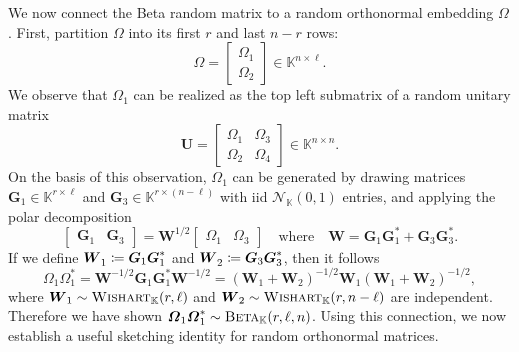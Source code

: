\documentclass[11pt]{article}
\newcommand{\field}{\mathbb{K}}
\newcommand{\mat}[1]{\boldsymbol{#1}}
\newcommand{\twobytwo}[4]{%
  \begin{bmatrix}#1 & #2 \\ #3 & #4\end{bmatrix}}
\newcommand{\onebytwo}[2]{%
  \begin{bmatrix}#1 & #2\end{bmatrix}}
\newcommand{\Wishart}{\textnormal{\textsc{Wishart}}}
\newcommand{\Beta}{\textnormal{\textsc{Beta}}}
\theoremstyle{definition}
\numberwithin{equation}{section}
\begin{document}
We now connect the Beta random matrix to a random orthonormal embedding $\mat{\varOmega}$.
First, partition $\mat{\varOmega}$ into its first $r$ and last $n - r$ rows:
\begin{equation*}
\mat{\varOmega} = \begin{bmatrix} \mat{\varOmega}_1 \\ \mat{\varOmega}_2 \end{bmatrix} \in \field^{n \times \ell}.
\end{equation*}
We observe that $\mat{\varOmega}_1$ can be realized as the top left submatrix of a random unitary matrix
%
\begin{equation*}
    \mat{U} = \twobytwo{\mat{\varOmega}_1}{\mat{\varOmega}_3}{\mat{\varOmega}_2}{\mat{\varOmega}_4} \in \field^{n\times n}.
\end{equation*}
%
On the basis of this observation, $\mat{\varOmega}_1$ can be generated by drawing matrices $\mat{G}_1 \in \field^{r \times \ell}$ and $\mat{G}_3 \in \field^{r \times (n - \ell)}$ with iid $\mathcal{N}_\field(0,1)$ entries, and applying the polar decomposition
%
\begin{equation*}
    \onebytwo{\mat{G}_1}{\mat{G}_3} = \mat{W}^{1/2} \onebytwo{\mat{\varOmega}_1}{\mat{\varOmega}_3} \quad \text{where} \quad \mat{W} = \mat{G}_1 \mat{G}_1^* + \mat{G}_3 \mat{G}_3^*.
\end{equation*}
If we define $\mat{W}_1^{\vphantom{*}} \coloneqq \mat{G}_1 \mat{G}_1^*$ and $\mat{W}_2^{\vphantom{*}} \coloneqq \mat{G}_3 \mat{G}_3^*$, then it follows
%
\begin{equation*}
    \mat{\varOmega}_1 \mat{\varOmega}_1^* 
    = \mat{W}^{-1/2}\mat{G}_1 \mat{G}_1^* \mat{W}^{-1/2} = (\mat{W}_1+\mat{W}_2)^{-1/2}\mat{W}_1(\mat{W}_1+\mat{W}_2)^{-1/2},
\end{equation*}
where $\mat{W}_1 \sim \Wishart_\field(r,\ell)$ and $\mat{W}_2\sim \Wishart_\field(r,n-\ell)$ are independent.
Therefore we have shown $\mat{\varOmega}_1 \mat{\varOmega}_1^* \sim \Beta_\field(r,\ell,n)$.
Using this connection, we now establish a useful sketching identity for random orthonormal matrices.
\end{document}
